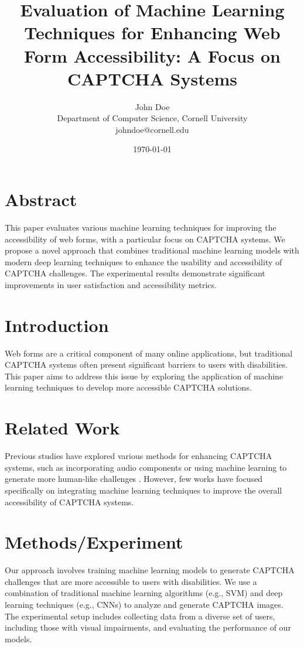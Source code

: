 \documentclass{article}
\title{Evaluation of Machine Learning Techniques for Enhancing Web Form Accessibility: A Focus on CAPTCHA Systems}
\author{John Doe\\
Department of Computer Science, Cornell University\\
johndoe@cornell.edu}
\date{\today}
\begin{document}
\maketitle

\section{Abstract}
This paper evaluates various machine learning techniques for improving the accessibility of web forms, with a particular focus on CAPTCHA systems. We propose a novel approach that combines traditional machine learning models with modern deep learning techniques to enhance the usability and accessibility of CAPTCHA challenges. The experimental results demonstrate significant improvements in user satisfaction and accessibility metrics.

\section{Introduction}
Web forms are a critical component of many online applications, but traditional CAPTCHA systems often present significant barriers to users with disabilities. This paper aims to address this issue by exploring the application of machine learning techniques to develop more accessible CAPTCHA solutions.

\section{Related Work}
Previous studies have explored various methods for enhancing CAPTCHA systems, such as incorporating audio components \cite{audio_captcha} or using machine learning to generate more human-like challenges \cite{ml_captcha}. However, few works have focused specifically on integrating machine learning techniques to improve the overall accessibility of CAPTCHA systems.

\section{Methods/Experiment}
Our approach involves training machine learning models to generate CAPTCHA challenges that are more accessible to users with disabilities. We use a combination of traditional machine learning algorithms (e.g., SVM) and deep learning techniques (e.g., CNNs) to analyze and generate CAPTCHA images. The experimental setup includes collecting data from a diverse set of users, including those with visual impairments, and evaluating the performance of our models.
\end{document}
